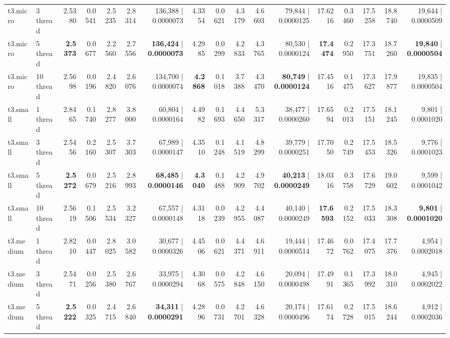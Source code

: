 \documentclass[conference]{IEEEtran}
\begin{document}
\begin{table}[h]
{\begin{tabular}{ll|rrrrr|rrrrr|rrrrr}
			t3.micro & 3 thread & 2.5380 & 0.0541 & 2.5235 & 2.8314 & 136,388 | 0.0000073 & 4.3354 & 0.0621 & 4.3179 & 4.6603 & 79,844 | 0.0000125 & 17.6216 & 0.3460 & 17.5258 & 18.8740 & 19,644 | 0.0000509 \\
			t3.micro & 5 thread & \textbf{2.5373} & 0.0677 & 2.2560 & 2.7556 & \textbf{136,424} | \textbf{0.0000073} & 4.2985 & 0.0299 & 4.2833 & 4.3765 & 80,530 | 0.0000124 & \textbf{17.4474} & 0.2950 & 17.3751 & 18.7260 & \textbf{19,840} | \textbf{0.0000504} \\
			t3.micro & 10 thread & 2.5698 & 0.0196 & 2.4820 & 2.6076 & 134,700 | 0.0000074 & \textbf{4.2868} & 0.1018 & 3.7388 & 4.3470 & \textbf{80,749} | \textbf{0.0000124} & 17.4516 & 0.1475 & 17.3627 & 17.9877 & 19,835 | 0.0000504 \\
			\midrule
			t3.small & 1 thread & 2.8465 & 0.1740 & 2.8277 & 3.8000 & 60,804 | 0.0000164 & 4.4982 & 0.1693 & 4.4650 & 5.3317 & 38,477 | 0.0000260 & 17.6594 & 0.2013 & 17.5151 & 18.1245 & 9,801 | 0.0001020 \\
			t3.small & 3 thread & 2.5456 & 0.2160 & 2.5307 & 3.7303 & 67,989 | 0.0000147 & 4.3510 & 0.1248 & 4.1519 & 4.8299 & 39,779 | 0.0000251 & 17.7050 & 0.2749 & 17.5453 & 18.5326 & 9,776 | 0.0001023 \\
			t3.small & 5 thread & \textbf{2.5272} & 0.0679 & 2.5216 & 2.8993 & \textbf{68,485} | \textbf{0.0000146} & \textbf{4.3040} & 0.1488 & 4.2909 & 4.9702 & \textbf{40,213} | \textbf{0.0000249} & 18.0316 & 0.3758 & 17.6729 & 19.0602 & 9,599 | 0.0001042 \\
			t3.small & 10 thread & 2.5619 & 0.1506 & 2.5534 & 3.2327 & 67,557 | 0.0000148 & 4.3118 & 0.0239 & 4.2955 & 4.4087 & 40,140 | 0.0000249 & \textbf{17.6593} & 0.2152 & 17.5033 & 18.3308 & \textbf{9,801} | \textbf{0.0001020} \\
			\midrule
			t3.medium & 1 thread & 2.8210 & 0.0447 & 2.8025 & 3.0582 & 30,677 | 0.0000326 & 4.4506 & 0.0621 & 4.4371 & 4.6911 & 19,444 | 0.0000514 & 17.4672 & 0.0762 & 17.4075 & 17.7376 & 4,954 | 0.0002018 \\
			t3.medium & 3 thread & 2.5471 & 0.0256 & 2.5380 & 2.6767 & 33,975 | 0.0000294 & 4.3068 & 0.0575 & 4.2848 & 4.6150 & 20,094 | 0.0000498 & 17.4991 & 0.1365 & 17.3992 & 18.0310 & 4,945 | 0.0002022 \\
			t3.medium & 5 thread & \textbf{2.5222} & 0.0325 & 2.4715 & 2.6840 & \textbf{34,311} | \textbf{0.0000291} & 4.2896 & 0.0731 & 4.2701 & 4.6328 & 20,174 | 0.0000496 & 17.6174 & 0.2728 & 17.5015 & 18.6244 & 4,912 | 0.0002036 \\

\end{tabular}}
\end{table}
\end{document}
